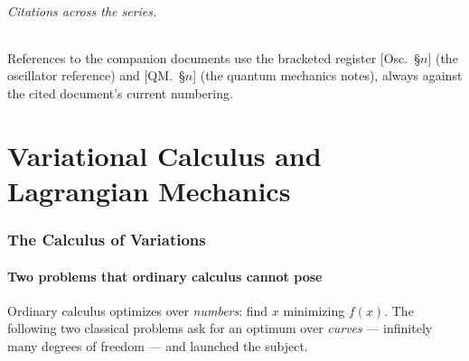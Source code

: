 \documentclass[11pt]{article}
\theoremstyle{plain}
\theoremstyle{definition}
\theoremstyle{remark}
\begin{document}
\paragraph{Citations across the series.} References to the companion
documents use the bracketed register [Osc.\ \S$n$] (the oscillator
reference) and [QM.\ \S$n$] (the quantum mechanics notes), always
against the cited document's current numbering.

\clearpage
\part{Variational Calculus and Lagrangian Mechanics}

\section{The Calculus of Variations}
\label{sec:calcvar}

\subsection{Two problems that ordinary calculus cannot pose}
\label{sec:two-problems}

Ordinary calculus optimizes over \emph{numbers}: find $x$ minimizing
$f(x)$. The following two classical problems ask for an optimum over
\emph{curves} --- infinitely many degrees of freedom --- and launched the
subject.
\end{document}
